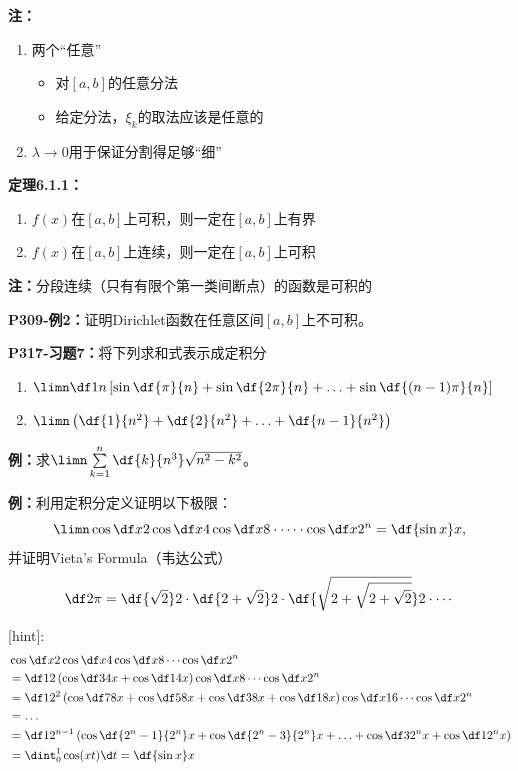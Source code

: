 {\bf 注：}
\begin{enumerate}[(1)]
  \setlength{\itemindent}{1cm}
  \item 两个“任意”
  \begin{itemize}
    \item 对$[a,b]$的任意分法
    \item 给定分法，$\xi_k$的取法应该是任意的
  \end{itemize}
  \item $\lambda\to 0$用于保证分割得足够“细”
\end{enumerate}

{\bf 定理6.1.1：}
\begin{enumerate}[(1)]
  \setlength{\itemindent}{1cm}
  \item $f(x)$在$[a,b]$上可积，则一定在$[a,b]$上有界 
  \item $f(x)$在$[a,b]$上连续，则一定在$[a,b]$上可积 
\end{enumerate}

{\bf 注：}分段连续（只有有限个第一类间断点）的函数是可积的

{\bf P309-例2：}证明Dirichlet函数在任意区间$[a,b]$上不可积。

{\bf P317-习题7：}将下列求和式表示成定积分 
\begin{enumerate}[(1)]
  \setlength{\itemindent}{1cm}
  \item $\limn\df 1n\left[\sin\df{\pi}{n}+\sin\df{2\pi}{n}+\ldots
  +\sin\df{(n-1)\pi}{n}\right]$ 
  \item $\limn\left(\df{1}{n^2}+\df{2}{n^2}+\ldots+\df{n-1}{n^2}\right)$
\end{enumerate}

{\bf 例：}求$\limn\sum\limits_{k=1}^n\df{k}{n^3}\sqrt{n^2-k^2}$。

{\bf 例：}利用定积分定义证明以下极限：
$$\limn\cos\df x2\cos\df x4\cos\df x8\cdot\cdots\cdot\cos\df x{2^n}
=\df{\sin x}x,$$
并证明Vieta's Formula（韦达公式）
$$\df2\pi=\df{\sqrt2}2\cdot\df{2+\sqrt2}2\cdot\df{\sqrt{2+\sqrt{2+\sqrt2}}}2
\cdot\cdots$$

{[hint]:}
\begin{align}
	&\cos\df x2\cos\df x4\cos\df x8\cdots\cos\df x{2^n}\notag\\
	&=\df12\left(\cos\df34x+\cos\df14x\right)\cos\df x8\cdots\cos\df
	x{2^n}\notag\\
	&=\df1{2^2}\left(\cos\df78x+\cos\df58x+\cos\df38x+\cos\df18x\right)
	\cos\df x{16}\cdots\cos\df x{2^n}\notag\\
	&=\ldots\notag\\
	&=\df1{2^{n-1}}\left(\cos\df{2^n-1}{2^n}x+\cos\df{2^n-3}{2^n}x+
	\ldots+\cos\df3{2^n}x+\cos\df1{2^n}x\right)\notag\\
	&=\dint_0^1\cos(xt)\d t=\df{\sin x}x\notag
\end{align}

